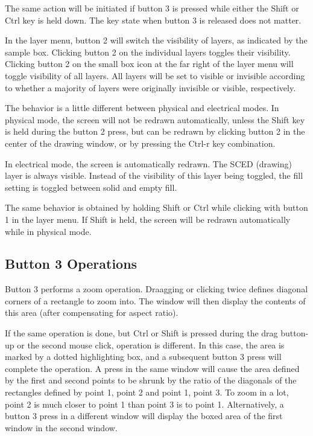 The same action will be initiated if button 3 is pressed while either
the {\kb Shift} or {\kb Ctrl} key is held down.  The key state when
button 3 is released does not matter.

In the layer menu, button 2 will switch the visibility of layers, as
indicated by the sample box.  Clicking button 2 on the individual
layers toggles their visibility.  Clicking button 2 on the small box
icon at the far right of the layer menu will toggle visibility of all
layers.  All layers will be set to visible or invisible according to
whether a majority of layers were originally invisible or visible,
respectively.

The behavior is a little different between physical and electrical
modes.  In physical mode, the screen will not be redrawn
automatically, unless the {\kb Shift} key is held during the button 2
press, but can be redrawn by clicking button 2 in the center of the
drawing window, or by pressing the {\kb Ctrl-r} key combination.

In electrical mode, the screen is automatically redrawn.  The SCED
(drawing) layer is always visible.  Instead of the visibility of this
layer being toggled, the fill setting is toggled between solid and
empty fill.

The same behavior is obtained by holding {\kb Shift} or {\kb Ctrl}
while clicking with button 1 in the layer menu.  If {\kb Shift} is
held, the screen will be redrawn automatically while in physical
mode.

\subsection{Button 3 Operations}
Button 3 performs a zoom operation.  Draagging or clicking twice
defines diagonal corners of a rectangle to zoom into.  The window will
then display the contents of this area (after compensating for aspect
ratio).

If the same operation is done, but {\kb Ctrl} or {\kb Shift} is
pressed during the drag button-up or the second mouse click, operation
is different.  In this case, the area is marked by a dotted
highlighting box, and a subsequent button 3 press will complete the
operation.  A press in the same window will cause the area defined by
the first and second points to be shrunk by the ratio of the diagonals
of the rectangles defined by point 1, point 2 and point 1, point 3. 
To zoom in a lot, point 2 is much closer to point 1 than point 3 is to
point 1.  Alternatively, a button 3 press in a different window will
display the boxed area of the first window in the second window.

